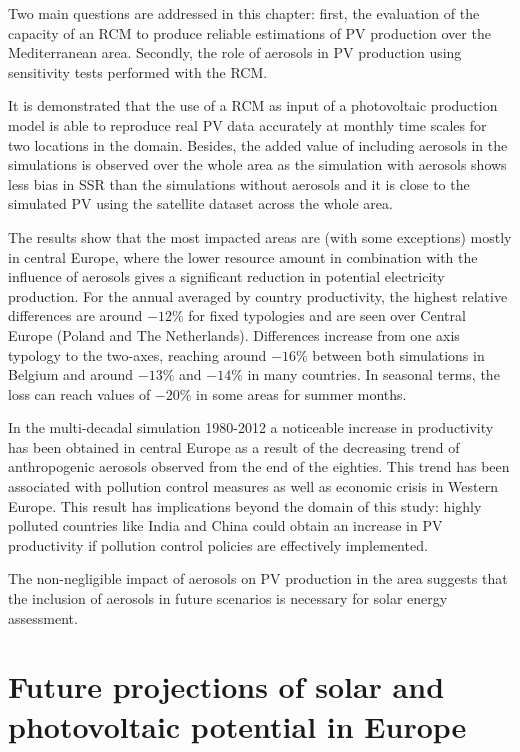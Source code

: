 Two main questions are addressed in this chapter: first, the evaluation of the capacity of an RCM to produce reliable estimations of PV production over the Mediterranean area. Secondly, the role of aerosols in PV production using sensitivity tests performed with the RCM. 

It is demonstrated that the use of a RCM as input of a photovoltaic production model is able to reproduce real PV data accurately at monthly time scales for two locations in the domain. Besides, the added value of including aerosols in the simulations is observed over the whole area as the simulation with aerosols shows less bias in SSR than the simulations without aerosols and it is close to the simulated PV using the satellite dataset across the whole area. 

The results show that the most impacted areas are (with some exceptions) mostly in central Europe, where the lower resource amount in combination with the influence of aerosols gives a significant reduction in potential electricity production. For the annual averaged by country productivity, the highest relative differences are around $-12\%$ for fixed typologies and are seen over Central Europe (Poland and The Netherlands). Differences increase from one axis typology to the two-axes, reaching around $-16\%$ between both simulations in Belgium and around $-13\%$ and $-14\%$ in many countries. In seasonal terms, the loss can reach values of $-20\%$ in some areas for summer months.

In the multi-decadal simulation 1980-2012 a noticeable increase in productivity has been obtained in central Europe as a result of the decreasing trend of anthropogenic aerosols observed from the end of the eighties. This trend has been associated with pollution control measures as well as economic crisis in Western Europe. This result has implications beyond the domain of this study: highly polluted countries like India and China could obtain an increase in PV productivity if pollution control policies are effectively implemented.

The non-negligible impact of aerosols on PV production in the area suggests that the inclusion of aerosols in future scenarios is necessary for solar energy assessment.

\chapter{Future projections of solar and photovoltaic  potential  in Europe}

